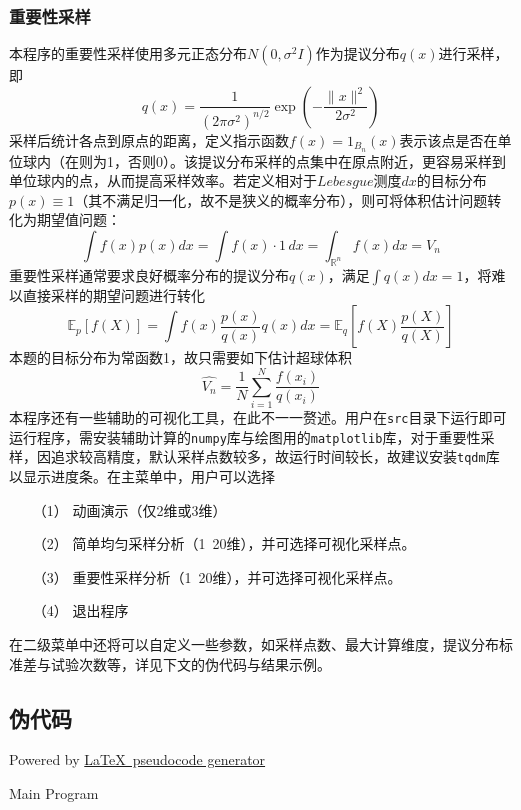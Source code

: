 \subsubsection{重要性采样}
本程序的重要性采样使用多元正态分布$N(0, \sigma^2 I)$作为提议分布$q(x)$进行采样，即
\[
    q(x) = \frac{1}{(2\pi \sigma^2)^{n/2}} \exp\left(-\frac{\|x\|^2}{2\sigma^2}\right)
\]
采样后统计各点到原点的距离，定义指示函数$ f(x) = 1_{B_n}(x) $表示该点是否在单位球内（在则为1，否则0）。该提议分布采样的点集中在原点附近，更容易采样到单位球内的点，从而提高采样效率。若定义相对于$Lebesgue$测度$dx$的目标分布$p(x) \equiv 1$（其不满足归一化，故不是狭义的概率分布），则可将体积估计问题转化为期望值问题：
\[
    \int f(x)p(x)dx = \int f(x)\cdot 1 \, dx = \int_{\mathbb{R}^n} f(x)dx = V_n
\]
重要性采样通常要求良好概率分布的提议分布$q(x)$，满足\(\int q(x)dx=1\)，将难以直接采样的期望问题进行转化
\[
    \mathbb{E}_p[f(X)] = \int f(x) \frac{p(x)}{q(x)} q(x) dx = \mathbb{E}_q\left[f(X)\frac{p(X)}{q(X)}\right]
\]
本题的目标分布为常函数1，故只需要如下估计超球体积
\[
    \hat{V_n} = \frac{1}{N}\sum_{i=1}^N \frac{f(x_i)}{q(x_i)}
\]
本程序还有一些辅助的可视化工具，在此不一一赘述。用户在\texttt{src}目录下运行即可运行程序，需安装辅助计算的\texttt{numpy}库与绘图用的\texttt{matplotlib}库，对于重要性采样，因追求较高精度，默认采样点数较多，故运行时间较长，故建议安装\texttt{tqdm}库以显示进度条。在主菜单中，用户可以选择
\begin{itemize}
    \item[（1）] 动画演示（仅2维或3维）
    \item[（2）] 简单均匀采样分析（1~20维），并可选择可视化采样点。
    \item[（3）] 重要性采样分析（1~20维），并可选择可视化采样点。
    \item[（4）] 退出程序
\end{itemize}
在二级菜单中还将可以自定义一些参数，如采样点数、最大计算维度，提议分布标准差与试验次数等，详见下文的伪代码与结果示例。
\subsection{伪代码}
Powered by \href{https://chatgpt.com/g/g-xJJAA2awf-latex-pseudocode-generator}{\LaTeX \ pseudocode generator}

\begin{algorithm}[H]
    \SetAlgoLined

    \;
    \caption{Main Program}
\end{algorithm}

